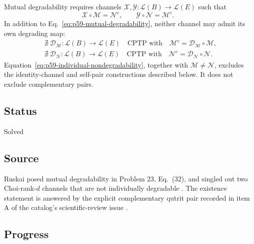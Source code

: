 Mutual degradability requires channels
$\mathcal X,\mathcal Y:\mathcal L(B)\to\mathcal L(E)$ such that
\begin{equation}
  \mathcal X\circ\mathcal M=\mathcal N^c,
  \qquad
  \mathcal Y\circ\mathcal N=\mathcal M^c.
  \label{eq:p59-mutual-degradability}
\end{equation}
In addition to Eq.~\eqref{eq:p59-mutual-degradability}, neither channel may
admit its own degrading map:
\begin{equation}
  \begin{aligned}
    &\nexists\ \mathcal D_{\mathcal M}:\mathcal L(B)\to\mathcal L(E)
      \quad\text{CPTP with}\quad
      \mathcal M^c=\mathcal D_{\mathcal M}\circ\mathcal M,\\
    &\nexists\ \mathcal D_{\mathcal N}:\mathcal L(B)\to\mathcal L(E)
      \quad\text{CPTP with}\quad
      \mathcal N^c=\mathcal D_{\mathcal N}\circ\mathcal N.
  \end{aligned}
  \label{eq:p59-individual-nondegradability}
\end{equation}
Equation~\eqref{eq:p59-individual-nondegradability}, together with
$\mathcal M\neq\mathcal N$, excludes the identity-channel and self-pair constructions described below.
It does not exclude complementary pairs.

\subsection*{Status}

Solved

\subsection*{Source}

Ruskai posed mutual degradability in Problem 23, Eq.~(32), and singled out
two Choi-rank-$d$ channels that are not individually degradable
. The existence statement is answered by
the explicit complementary qutrit pair recorded in item A of the catalog's
scientific-review issue .

\subsection*{Progress}

